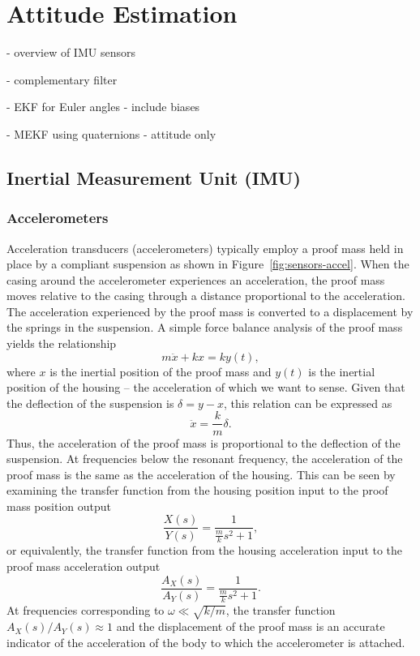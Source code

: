 \chapter{Attitude Estimation}
\label{chap:attitude_estimation}

- overview of IMU sensors

- complementary filter

- EKF for Euler angles - include biases

- MEKF using quaternions
	- attitude only


\section{Inertial Measurement Unit (IMU)}

\subsection{Accelerometers}
Acceleration transducers (accelerometers) typically employ a proof mass held in place by a compliant suspension as shown in Figure~\ref{fig:sensors-accel}. When the casing around the accelerometer experiences an acceleration, the proof mass moves relative to the casing through a distance proportional to the acceleration. The acceleration experienced by the proof mass is converted to a displacement by the springs in the suspension.  A simple force balance analysis of the proof mass yields the relationship
\[
m\ddot{x} + kx = ky(t) ,
\]
where $x$ is the inertial position of the proof mass and $y(t)$ is the inertial position of the housing -- the acceleration of which we want to sense. Given that the deflection of the suspension is $\delta = y-x$, this relation can be expressed as
\[
\ddot{x} = \frac{k}{m} \delta .
\]
Thus, the acceleration of the proof mass is proportional to the deflection of the suspension. At frequencies below the resonant frequency, the acceleration of the proof mass is the same as the acceleration of the housing. This can be seen by examining the transfer function from the housing position input to the proof mass position output
\[
\frac{X(s)}{Y(s)} = \frac{1}{\frac{m}{k}s^2+1} ,
\]
or equivalently, the transfer function from the housing acceleration input to the proof mass acceleration output
\[
\frac{A_X(s)}{A_Y(s)} = \frac{1}{\frac{m}{k}s^2+1} .
\]
At frequencies corresponding to $\omega\ll\sqrt{k/m}$, the transfer function $A_X(s)/A_Y(s) \approx 1$ and the displacement of the proof mass is an accurate indicator of the acceleration of the body to which the accelerometer is attached.

